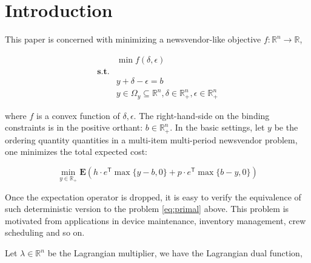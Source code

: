 \documentclass[../main]{subfiles}
\begin{document}
\maketitle
{
  \setcounter{tocdepth}{3}
  \tableofcontents
}


\section{Introduction}\label{introduction}

This paper is concerned with minimizing a newsvendor-like objective \(f: \mathbb R^n \to \mathbb R\),

\begin{equation}\label{eq:primal}
  \begin{aligned}
                  & \min f(\delta, \epsilon)                                                                       \\
    \mathbf{s.t.} &                                                                                                \\
                  & y + \delta - \epsilon = b                                                                      \\
                  & y \in \Omega_y \subseteq \mathbb{R}^n, \delta \in \mathbb{R}^n_+ , \epsilon \in \mathbb{R}^n_+
  \end{aligned}
\end{equation}

where \(f\) is a convex function of \(\delta, \epsilon\). The
right-hand-side on the binding constraints is in the positive orthant:
\(b \in \mathbb R_+^n\).  In the basic
settings, let \(y\) be the ordering quantity quantities in a multi-item multi-period
newsvendor problem, one minimizes the total expected cost:

\[\min_{y \in \mathbb R_+} \mathbf E\left(h\cdot e^\mathsf{T} \max\{y - b,  0\} + p \cdot e^\mathsf{T} \max\{b - y,  0\}\right)\]

Once the expectation operator is dropped, it is easy to verify the equivalence of such deterministic version
to the problem \eqref{eq:primal} above. This problem is motivated from applications
in device maintenance, inventory management, crew scheduling and so on.



Let \(\lambda\in\mathbb{R}^n\) be the Lagrangian multiplier, we have the Lagrangian dual function,
\end{document}

